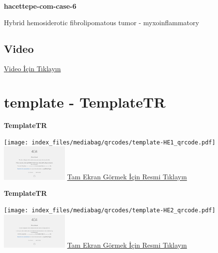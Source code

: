 \documentclass[
  letterpaper,
  DIV=11,
  numbers=noendperiod]{scrreprt}
\begin{document}
\textbf{hacettepe-com-case-6}

\begin{tcolorbox}[enhanced jigsaw, breakable, opacitybacktitle=0.6, arc=.35mm, colbacktitle=quarto-callout-tip-color!10!white, colback=white, toptitle=1mm, left=2mm, opacityback=0, colframe=quarto-callout-tip-color-frame, titlerule=0mm, rightrule=.15mm, bottomrule=.15mm, toprule=.15mm, bottomtitle=1mm, title=\textcolor{quarto-callout-tip-color}{\faLightbulb}\hspace{0.5em}{Tanı}, coltitle=black, leftrule=.75mm]

Hybrid hemosiderotic fibrolipomatous tumor - myxoinflammatory

\end{tcolorbox}

\hypertarget{video-5}{%
\subsection{Video}\label{video-5}}

\href{https://www.youtube.com/watch?v=ipjRs0h1PnY}{Video İçin Tıklayın}

\hypertarget{sec-template}{%
\section{template - TemplateTR}\label{sec-template}}

\textbf{TemplateTR}

\texttt{[image: index\_files/mediabag/qrcodes/template-HE1\_qrcode.pdf]}
\href{https://images.patolojiatlasi.com/template/HE1.html}{\includegraphics[width=0.25\textwidth,height=\textheight]{./screenshots/thumbnail_template-HE1.png}}
\href{https://images.patolojiatlasi.com/template/HE1.html}{Tam Ekran
Görmek İçin Resmi Tıklayın}

\textbf{TemplateTR}

\texttt{[image: index\_files/mediabag/qrcodes/template-HE2\_qrcode.pdf]}
\href{https://images.patolojiatlasi.com/template/HE2.html}{\includegraphics[width=0.25\textwidth,height=\textheight]{./screenshots/thumbnail_template-HE2.png}}
\href{https://images.patolojiatlasi.com/template/HE2.html}{Tam Ekran
Görmek İçin Resmi Tıklayın}
\end{document}
